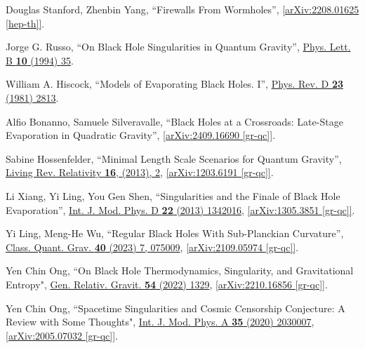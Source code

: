 \documentclass[12pt,preprintnumbers, floatfix, preprintnumbers, letterpaper, superscriptaddress,nofootinbib]{revtex4-2}
\begin{document}
\begin{thebibliography}{99}
Douglas Stanford, Zhenbin Yang, ``Firewalls From Wormholes'', \href{https://arxiv.org/abs/2208.01625}{[arXiv:2208.01625 [hep-th]]}.

Jorge G. Russo, ``On Black Hole Singularities in Quantum Gravity'', {\hypersetup{urlcolor=vividviolet}\href{https://www.sciencedirect.com/science/article/abs/pii/0370269394911290}{Phys. Lett. B \textbf{10} (1994) 35}}.

William A. Hiscock, ``Models of Evaporating Black Holes. I'', {\hypersetup{urlcolor=vividviolet}\href{https://journals.aps.org/prd/abstract/10.1103/PhysRevD.23.2813}{Phys. Rev. D \textbf{23} (1981) 2813}}.

Alfio Bonanno, Samuele Silveravalle, ``Black Holes at a Crossroads: Late-Stage Evaporation in Quadratic Gravity'', \href{https://arxiv.org/abs/2409.16690}{[arXiv:2409.16690 [gr-qc]]}.

Sabine Hossenfelder, ``Minimal Length Scale Scenarios for Quantum Gravity'', {\hypersetup{urlcolor=vividviolet}\href{https://link.springer.com/article/10.12942/lrr-2013-2}{Living Rev. Relativity \textbf{16}, (2013), 2}}, \href{https://arxiv.org/abs/1203.6191}{[arXiv:1203.6191 [gr-qc]]}.


Li Xiang, Yi Ling, You Gen Shen, ``Singularities and the Finale of Black Hole Evaporation'', {\hypersetup{urlcolor=vividviolet}\href{https://www.worldscientific.com/doi/abs/10.1142/S0218271813420169}{Int. J. Mod. Phys. D \textbf{22} (2013) 1342016}}, \href{https://arxiv.org/abs/1305.3851}{[arXiv:1305.3851 [gr-qc]]}.

Yi Ling, Meng-He Wu, ``Regular Black Holes With Sub-Planckian Curvature'', {\hypersetup{urlcolor=vividviolet}\href{https://iopscience.iop.org/article/10.1088/1361-6382/acc0c9}{Class. Quant. Grav. \textbf{40} (2023) 7, 075009}}, \href{https://arxiv.org/abs/2109.05974}{[arXiv:2109.05974 [gr-qc]]}.


Yen Chin Ong, ``On Black Hole Thermodynamics, Singularity, and Gravitational Entropy",  {\hypersetup{urlcolor=vividviolet}\href{https://link.springer.com/article/10.1007/s10714-022-03008-0}{Gen. Relativ. Gravit. \textbf{54} (2022) 1329}},  \href{https://arxiv.org/abs/2210.16856}{[arXiv:2210.16856 [gr-qc]]}.

Yen Chin Ong, ``Spacetime Singularities and Cosmic Censorship Conjecture: A Review with Some Thoughts", {\hypersetup{urlcolor=vividviolet}\href{https://www.worldscientific.com/doi/abs/10.1142/S0217751X20300070}{Int. J. Mod. Phys. A \textbf{35} (2020) 2030007}}, \href{https://arxiv.org/abs/2005.07032}{[arXiv:2005.07032 [gr-qc]]}.



\end{thebibliography}
\end{document}
